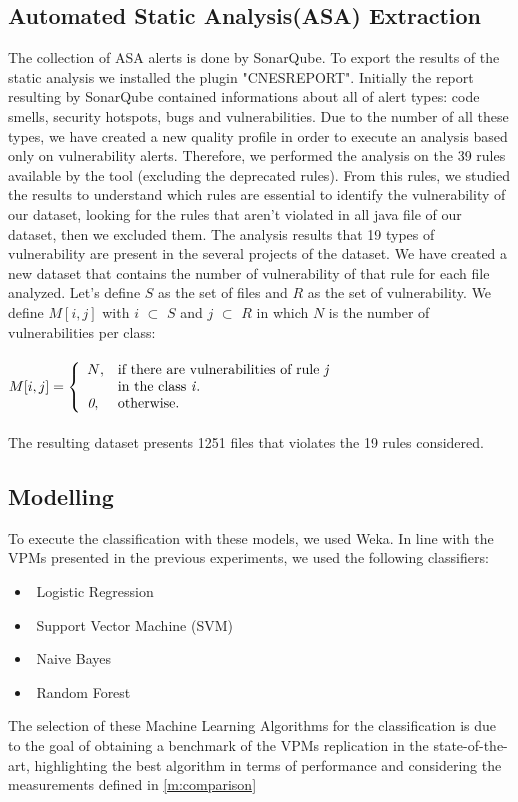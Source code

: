 \documentclass[twocolumn,10pt]{asme2ej}
\begin{document}
\subsection{Automated Static Analysis(ASA) Extraction}\label{m:ASA}
The collection of ASA alerts is done by SonarQube.
To export the results of the static analysis we installed the plugin "CNESREPORT".
Initially the report resulting by SonarQube contained informations about all of alert types: code smells, security hotspots, bugs and vulnerabilities. Due to the number of all these types, we have created a new quality profile in order to execute an analysis based only on vulnerability alerts.
Therefore, we performed the analysis on the 39 rules available by the tool (excluding the deprecated rules).
From this rules, we studied the results to understand which rules are essential to identify the vulnerability of our dataset, looking for the rules that aren't violated in all java file of our dataset, then we excluded them.
The analysis results that 19 types of vulnerability are present in the several projects of the dataset.
We have created a new dataset that contains the number of vulnerability of that rule for each file analyzed.
Let's define $S$ as the set of files and $R$ as the set of vulnerability.
We define $M[i,j]$ with $i$ $\subset$ $S$ and $j$ $\subset$ $R$ in which $N$ is the number of vulnerabilities per class:\\\\
\begin{math}
    M[i,j]=\left\{
    \begin{array}{ll}
      \mbox{$N$}, & \mbox{if there are vulnerabilities of rule \textit{j}} \\
        & \mbox{in the class \textit{i}}.\\
      \textit{0}, & \mbox{otherwise}.
    \end{array}
  \right.
\end{math}\\\\
The resulting dataset presents 1251 files that violates the 19 rules considered.

\subsection{Modelling}
\label{m:modelling}
To execute the classification with these models, we used Weka. 
In line with the VPMs presented in the previous experiments, we used the following classifiers:
\begin{itemize}
    \item \textbullet$ $ Logistic Regression
    \item \textbullet$ $ Support Vector Machine (SVM)
    \item \textbullet$ $ Naive Bayes
    \item \textbullet$ $ Random Forest
\end{itemize}
The selection of these Machine Learning Algorithms for the classification is due to the goal of obtaining a benchmark of the VPMs replication in the state-of-the-art, highlighting the best algorithm in terms of performance and considering the measurements defined in \ref{m:comparison}
\end{document}
